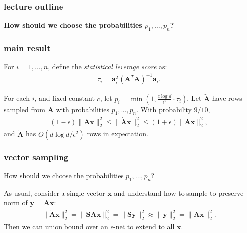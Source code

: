 \documentclass[compress]{beamer}
\newcommand{\bv}[1]{\mathbf{#1}}
\begin{document}
\begin{frame}[t]
	\frametitle{lecture outline}
	\begin{center}
		\alert{\textbf{How should we choose the probabilities $p_1, \ldots, p_n$?}}
	\end{center}
\end{frame}

\begin{frame}[t]
	\frametitle{main result}
	For $i = 1, \ldots, n$, define the \emph{statistical leverage score} as:
	\begin{align*}
		\tau_i = \bv{a}_i^T(\bv{A}^T\bv{A})^{-1}\bv{a}_i.
	\end{align*}	
	\begin{theorem}
		For each $i$, and fixed constant $c$, let $p_i = \min\left(1,\frac{c\log d}{\epsilon^2}\cdot \tau_i\right)$.
		Let ${\tilde{\bv{A}}}$ have rows sampled from $\bv{A}$ with probabilities $p_1, \ldots, p_n$. With probability $9/10$, 
		\begin{align*}
			(1-\epsilon)\|\bv{A}\bv{x}\|_2^2 \leq \|\tilde{\bv{A}} \bv{x}\|_2^2 \leq	(1+\epsilon)\|\bv{A}\bv{x}\|_2^2,
		\end{align*}
		and ${\tilde{\bv{A}}}$ has $O(d\log d/\epsilon^2)$ rows in expectation. 
	\end{theorem}
\end{frame}


\begin{frame}[t]
	\frametitle{vector sampling}
	\begin{center}
		How should we choose the probabilities $p_1, \ldots, p_n$?
	\end{center}
	As usual, consider a single vector $\bv{x}$ and understand how to sample to preserve norm of $\bv{y} = \bv{A}\bv{x}$:
	\begin{align*}
		\|\tilde{\bv{A}}\bv{x}\|_2^2 = \|\bv{S}{\bv{A}}\bv{x}\|_2^2 = \|\bv{S}\bv{y}\|_2^2 \approx \|\bv{y}\|_2^2 = \|\bv{Ax}\|_2^2. 
	\end{align*}
	Then we can union bound over an $\epsilon$-net to extend to all $\bv{x}$. 
\end{frame}
\end{document}
